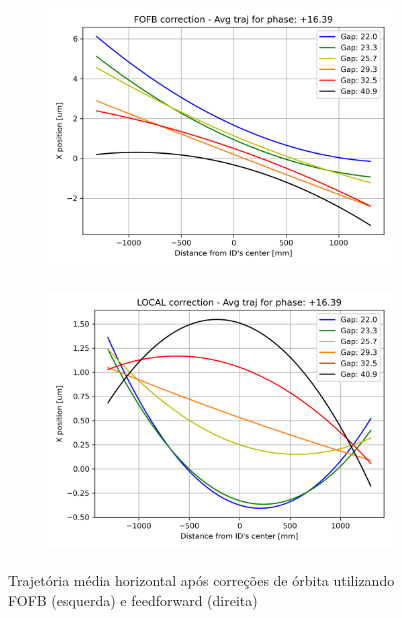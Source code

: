 \documentclass[a4paper,12pt]{article}
\begin{document}
\begin{figure}[H]
\begin{subfigure}{0.5\textwidth}
\includegraphics[width=0.9\linewidth, height=7cm]{figs/phase16 horizontal-avg-traj-FOFB.png} 
\label{fig:subim10xc16}
\end{subfigure}
\begin{subfigure}{0.5\textwidth}
\includegraphics[width=0.9\linewidth, height=7cm]{figs/phase16 horizontal-avg-traj-LOCAL.png}
\label{fig:subim20xc16}
\end{subfigure}
\caption{Trajetória média horizontal após correções de órbita utilizando FOFB (esquerda) e feedforward (direita)}
\label{fig:16corrx}
\end{figure}
\end{document}
